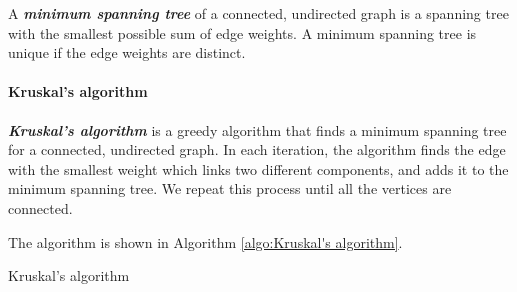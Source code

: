 \documentclass[12pt,a4paper]{ctexart}
\newcommand{\highlight}[1]{\textbf{\textit{#1}}}
\begin{document}
    A \highlight{minimum spanning tree} of a connected, undirected graph is a spanning tree with the smallest possible sum of edge weights. A minimum spanning tree is unique if the edge weights are distinct.

    \paragraph{Kruskal's algorithm}

    \highlight{Kruskal's algorithm} is a greedy algorithm that finds a minimum spanning tree for a connected, undirected graph. In each iteration, the algorithm finds the edge with the smallest weight which links two different components, and adds it to the minimum spanning tree. We repeat this process until all the vertices are connected.

    The algorithm is shown in Algorithm \ref{algo:Kruskal's algorithm}.

    \begin{algorithm}[!htbp]
        \caption{Kruskal's algorithm}
        \label{algo:Kruskal's algorithm}


    \end{algorithm}
\end{document}
